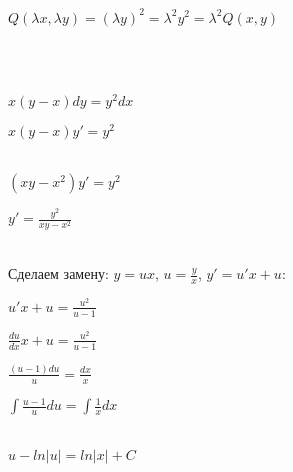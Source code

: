 \documentclass{article}
\begin{document}
\begin{flushleft}
    $Q(\lambda x, \lambda y) = (\lambda y)^2 = \lambda^2y^2 = \lambda^2 Q(x, y)$
\end{flushleft}

\begin{center}
    \\\\
\end{center}

\begin{flushleft}
   $x(y - x)dy = y^2dx$
\end{flushleft}

\begin{flushleft}
   $x(y-x)y' = y^2$\\\\
\end{flushleft}

\begin{flushleft}
   $(xy - x^2)y' = y^2$
\end{flushleft}

\begin{flushleft}
   $y' = \frac{y^2}{xy - x^2}$\\\\
\end{flushleft}

\begin{center}
    Сделаем замену: $y = ux$, $u = \frac{y}{x}$, $y' = u'x + u$:
\end{center}

\begin{flushleft}
    $u'x + u = \frac{u^2}{u - 1}$
\end{flushleft}

\begin{flushleft}
    $\frac{du}{dx}x + u = \frac{u^2}{u - 1}$
\end{flushleft}

\begin{flushleft}
   $\frac{(u - 1)du}{u} = \frac{dx}{x}$
\end{flushleft}

\begin{flushleft}
   $\int\frac{u-1}{u}du = \int\frac{1}{x}dx$\\\\
\end{flushleft}

\begin{flushleft}
   $u - ln|u| = ln|x| + C$
\end{flushleft}
\end{document}
